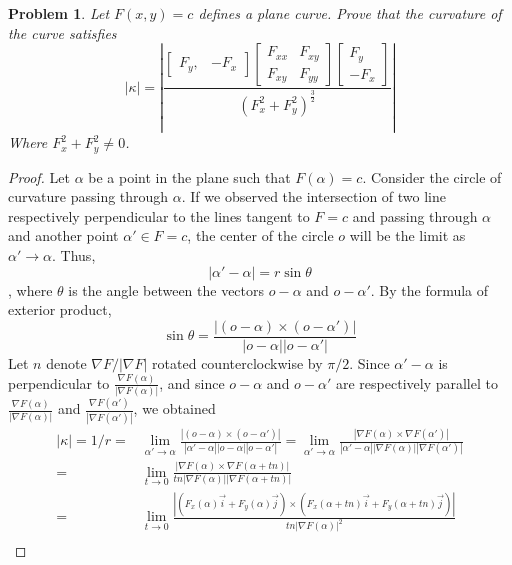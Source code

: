 \documentclass[12pt,a4paper]{article}
\newcounter{theProblemCounter}
\newtheorem{problem}[theProblemCounter]{Problem}
\begin{document}
\begin{problem}
Let $F(x, y)=c$ defines a plane curve. Prove that the curvature of the curve satisfies
\[
|\kappa| = \left|
\frac{
\left[
\begin{array}{cc} F_y, & -F_x\end{array}
\right]
\left[
\begin{array}{cc} F_{xx} & F_{xy} \\ F_{xy} & F_{yy} \end{array}
\right]
\left[
\begin{array}{c} F_y \\ -F_x\end{array}
\right]
}{(F_x^2+F_y^2)^\frac32}
\right|
\]
Where $F_x^2+F_y^2\ne 0$.
\end{problem}
\begin{proof}
Let $\alpha$ be a point in the plane such that $F(\alpha)=c$. Consider the circle of curvature passing through $\alpha$. If we observed the intersection of two line respectively perpendicular to the lines tangent to $F=c$ and passing through $\alpha$ and another point $\alpha'\in F=c$, the center of the circle $o$ will be the limit as $\alpha'\rightarrow \alpha$. 
Thus,
$$
	|\alpha' - \alpha| = r\sin \theta
$$
, where $\theta$ is the angle between the vectors $o-\alpha$ and $o-\alpha'$. By the formula of exterior product, 
$$
	\sin\theta = \frac{|(o - \alpha) \times (o - \alpha')|}{|o - \alpha||o - \alpha'|}
$$
Let $n$ denote $ \displaystyle \nabla F/|\nabla F| $ rotated counterclockwise by $\pi/2$.
Since $\alpha' - \alpha$ is perpendicular to $\displaystyle\frac{\nabla F(\alpha)}{|\nabla F(\alpha)|} $, and since $o - \alpha$ and $o - \alpha'$ are respectively parallel to $\displaystyle \frac{\nabla F(\alpha)}{|\nabla F(\alpha)|} $ and $ \displaystyle\frac{\nabla F(\alpha')}{|\nabla F(\alpha')|} $, we obtained
\begin{align*}
	|\kappa| = 1/r = &\lim_{\alpha'\rightarrow \alpha}\frac{|(o - \alpha) \times (o - \alpha')|}{|\alpha' - \alpha||o - \alpha||o - \alpha'|} =
	      \lim_{\alpha'\rightarrow \alpha}\frac{|\nabla F(\alpha) \times \nabla F(\alpha')|}{|\alpha' - \alpha||\nabla F(\alpha)||\nabla F(\alpha')|}\\
	      = &\lim_{t\rightarrow 0}\frac{|\nabla F(\alpha) \times \nabla F(\alpha + tn)|}{tn|\nabla F(\alpha)||\nabla F(\alpha + tn)|} \\
	      = &\lim_{t\rightarrow 0}\frac{|(F_x(\alpha)\vec i + F_y(\alpha)\vec j) \times (F_x(\alpha + tn)\vec i + F_y(\alpha + tn)\vec j)|}{tn|\nabla F(\alpha)|^2}\\

\end{align*}
\end{proof}
\end{document}
